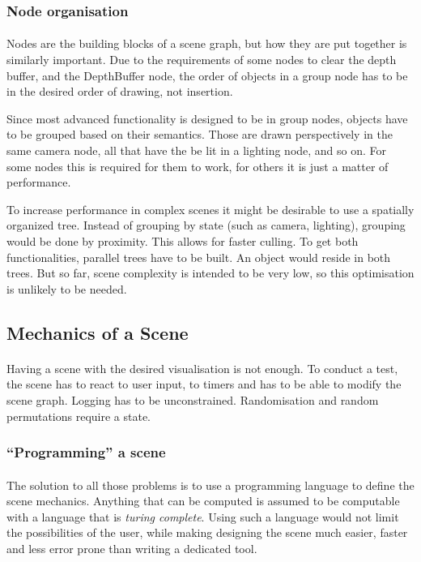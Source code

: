 \subsubsection{Node organisation}
\paragraph{}
Nodes are the building blocks of a scene graph, but how they are put together is similarly important. Due to the requirements of some nodes to clear the depth buffer, and the DepthBuffer node, the order of objects in a group node has to be in the desired order of drawing, not insertion.

Since most advanced functionality is designed to be in group nodes, objects have to be grouped based on their semantics. Those are drawn perspectively in the same camera node, all that have the be lit in a lighting node, and so on. For some nodes this is required for them to work, for others it is just a matter of performance.

To increase performance in complex scenes it might be desirable to use a spatially organized tree. Instead of grouping by state (such as camera, lighting), grouping would be done by proximity. This allows for faster culling. To get both functionalities, parallel trees have to be built. An object would reside in both trees. But so far, scene complexity is intended to be very low, so this optimisation is unlikely to be needed.


\subsection{Mechanics of a Scene\label{sceneMech}}
\paragraph{}
Having a scene with the desired visualisation is not enough. To conduct a test, the scene has to react to user input, to timers and has to be able to modify the scene graph. Logging has to be unconstrained. Randomisation and random permutations require a state.

\subsubsection{``Programming'' a scene}
\paragraph{}
The solution to all those problems is to use a programming language to define the scene mechanics. Anything that can be computed is assumed to be computable with a language that is \textit{turing complete}\cite{turing}. Using such a language would not limit the possibilities of the user, while making designing the scene much easier, faster and less error prone than writing a dedicated tool.


